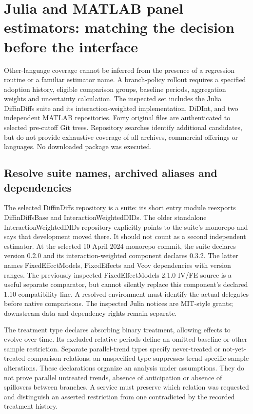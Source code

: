\section{Julia and MATLAB panel estimators: matching the decision before the interface}
\label{sec:exec25-panels-other}
Other-language coverage cannot be inferred from the presence of a regression
routine or a familiar estimator name. A branch-policy rollout requires a
specified adoption history, eligible comparison groups, baseline periods,
aggregation weights and uncertainty calculation. The inspected set includes
the Julia DiffinDiffs suite and its interaction-weighted implementation,
DiDInt, and two independent MATLAB repositories. Forty original files are
authenticated to selected pre-cutoff Git trees. Repository searches identify
additional candidates, but do not provide exhaustive coverage of all archives,
commercial offerings or languages. No downloaded package was executed.
\citep{exec25_panelother_choice}

\subsection{Resolve suite names, archived aliases and dependencies}
The selected DiffinDiffs repository is a suite: its short entry module
reexports DiffinDiffsBase and InteractionWeightedDIDs. The older standalone
InteractionWeightedDIDs repository explicitly points to the suite's monorepo
and says that development moved there. It should not count as a second
independent estimator. At the selected 10 April 2024 monorepo commit, the
suite declares version 0.2.0 and its interaction-weighted component declares
0.3.2. The latter names FixedEffectModels, FixedEffects and Vcov dependencies
with version ranges. The previously inspected FixedEffectModels 2.1.0 IV/FE
source is a useful separate comparator, but cannot silently replace this
component's declared 1.10 compatibility line. A resolved environment must
identify the actual delegates before native comparisons. The inspected
Julia notices are MIT-style grants; downstream data and dependency rights
remain separate.\citep{exec25_panelother_julia,exec23_otheriv_source_0}

The treatment type declares absorbing binary treatment, allowing effects to
evolve over time. Its excluded relative periods define an omitted baseline
or other sample restriction. Separate parallel-trend types specify
never-treated or not-yet-treated comparison relations; an unspecified type
suppresses trend-specific sample alterations. These declarations organize
an analysis under assumptions. They do not prove parallel untreated trends,
absence of anticipation or absence of spillovers between branches. A service
must preserve which relation was requested and distinguish an asserted
restriction from one contradicted by the recorded treatment history.
\citep{exec25_panelother_julia,exec25_panelother_choice}

